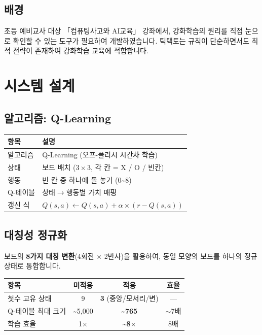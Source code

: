 \documentclass[11pt,a4paper]{article}
\begin{document}
\subsection{배경}

초등 예비교사 대상 「컴퓨팅사고와 AI교육」 강좌에서, 강화학습의 원리를 직접 눈으로 확인할 수 있는 도구가 필요하여 개발하였습니다. 틱택토는 규칙이 단순하면서도 최적 전략이 존재하여 강화학습 교육에 적합합니다.

\section{시스템 설계}

\subsection{알고리즘: Q-Learning}

\begin{center}
\renewcommand{\arraystretch}{1.4}
\begin{tabular}{|l|p{9cm}|}
\hline
\rowcolor{tableheader}
\textbf{항목} & \textbf{설명} \\
\hline
알고리즘 & Q-Learning (오프-폴리시 시간차 학습) \\
\hline
상태 & 보드 배치 ($3\times3$, 각 칸 = X / O / 빈칸) \\
\hline
행동 & 빈 칸 중 하나에 돌 놓기 (0\textasciitilde8) \\
\hline
Q-테이블 & 상태$\to$행동별 가치 매핑 \\
\hline
갱신 식 & $Q(s,a) \leftarrow Q(s,a) + \alpha \times (r - Q(s,a))$ \\
\hline
\end{tabular}
\end{center}

\subsection{대칭성 정규화}

보드의 \textbf{8가지 대칭 변환}(4회전 $\times$ 2반사)을 활용하여, 동일 모양의 보드를 하나의 정규 상태로 통합합니다.

\begin{center}
\renewcommand{\arraystretch}{1.4}
\begin{tabular}{|l|c|c|c|}
\hline
\rowcolor{tableheader}
\textbf{항목} & \textbf{미적용} & \textbf{적용} & \textbf{효율} \\
\hline
첫수 고유 상태 & 9 & \textbf{3} (중앙/모서리/변) & — \\
\hline
Q-테이블 최대 크기 & \textasciitilde5,000 & \textbf{\textasciitilde765} & $\sim$7배 \\
\hline
학습 효율 & 1$\times$ & \textbf{\textasciitilde8$\times$} & 8배 \\
\hline
\end{tabular}
\end{center}
\end{document}
